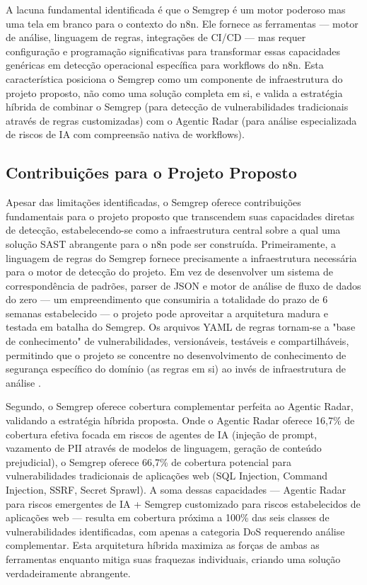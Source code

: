 \documentclass{sftex}
\begin{document}
A lacuna fundamental identificada é que o Semgrep é um motor poderoso mas uma tela em branco para o contexto do n8n. Ele fornece as ferramentas — motor de análise, linguagem de regras, integrações de CI/CD — mas requer configuração e programação significativas para transformar essas capacidades genéricas em detecção operacional específica para workflows do n8n. Esta característica posiciona o Semgrep como um componente de infraestrutura do projeto proposto, não como uma solução completa em si, e valida a estratégia híbrida de combinar o Semgrep (para detecção de vulnerabilidades tradicionais através de regras customizadas) com o Agentic Radar (para análise especializada de riscos de IA com compreensão nativa de workflows).

\subsection{Contribuições para o Projeto Proposto}

Apesar das limitações identificadas, o Semgrep oferece contribuições fundamentais para o projeto proposto que transcendem suas capacidades diretas de detecção, estabelecendo-se como a infraestrutura central sobre a qual uma solução SAST abrangente para o n8n pode ser construída. Primeiramente, a linguagem de regras do Semgrep fornece precisamente a infraestrutura necessária para o motor de detecção do projeto. Em vez de desenvolver um sistema de correspondência de padrões, parser de JSON e motor de análise de fluxo de dados do zero — um empreendimento que consumiria a totalidade do prazo de 6 semanas estabelecido — o projeto pode aproveitar a arquitetura madura e testada em batalha do Semgrep. Os arquivos YAML de regras tornam-se a "base de conhecimento" de vulnerabilidades, versionáveis, testáveis e compartilháveis, permitindo que o projeto se concentre no desenvolvimento de conhecimento de segurança específico do domínio (as regras em si) ao invés de infraestrutura de análise \cite{semgrep_custom_rules}.

Segundo, o Semgrep oferece cobertura complementar perfeita ao Agentic Radar, validando a estratégia híbrida proposta. Onde o Agentic Radar oferece 16,7\% de cobertura efetiva focada em riscos de agentes de IA (injeção de prompt, vazamento de PII através de modelos de linguagem, geração de conteúdo prejudicial), o Semgrep oferece 66,7\% de cobertura potencial para vulnerabilidades tradicionais de aplicações web (SQL Injection, Command Injection, SSRF, Secret Sprawl). A soma dessas capacidades — Agentic Radar para riscos emergentes de IA + Semgrep customizado para riscos estabelecidos de aplicações web — resulta em cobertura próxima a 100\% das seis classes de vulnerabilidades identificadas, com apenas a categoria DoS requerendo análise complementar. Esta arquitetura híbrida maximiza as forças de ambas as ferramentas enquanto mitiga suas fraquezas individuais, criando uma solução verdadeiramente abrangente.
\end{document}
